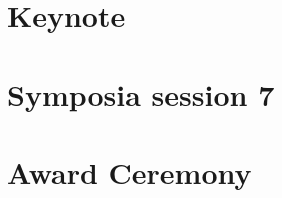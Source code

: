 
\section{Keynote}



\newpage

\section{Symposia session 7}


\newpage

\section{Award Ceremony}


\newpage
